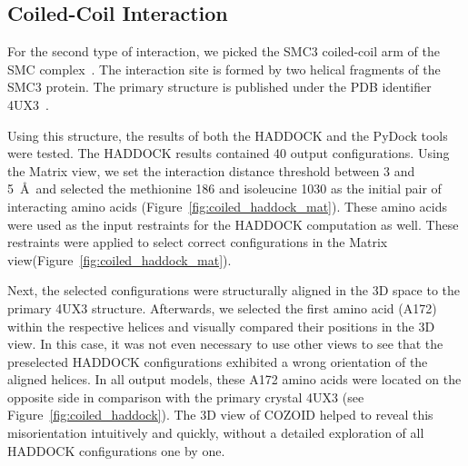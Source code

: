 \documentclass{bmcart}
\def\MatView {Matrix view\xspace}
\begin{document}



\subsection*{Coiled-Coil Interaction}
For the second type of interaction, we picked the SMC3 coiled-coil arm of the SMC complex~\cite{Gligoris}.
The interaction site is formed by two helical fragments of the SMC3 protein.
The primary structure is published under the PDB identifier 4UX3~\cite{pmid25414305}.  

Using this structure, the results of both the HADDOCK and the PyDock tools were tested.
The HADDOCK results contained 40 output configurations.
Using the \MatView, we set the interaction distance threshold between 3 and 5~\AA~and selected the methionine 186 and isoleucine 1030 as the initial pair of interacting amino acids (Figure~\ref{fig:coiled_haddock_mat}). 
These amino acids were used as the input restraints for the HADDOCK computation as well.
These restraints were applied to select correct configurations in the \MatView (Figure~\ref{fig:coiled_haddock_mat}).

Next, the selected configurations were structurally aligned in the 3D space to the primary 4UX3 structure.
Afterwards, we selected the first amino acid (A172) within the respective helices and visually compared their positions in the 3D view.
In this case, it was not even necessary to use other views to see that the preselected HADDOCK configurations exhibited a wrong orientation of the aligned helices. 
In all output models, these A172 amino acids were located on the opposite side in comparison with the primary crystal 4UX3 (see Figure~\ref{fig:coiled_haddock}). 
The 3D view of COZOID helped to reveal this misorientation intuitively and quickly, without a detailed exploration of all HADDOCK configurations one by one.
\end{document}
